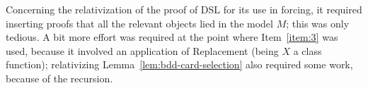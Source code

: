 Concerning the relativization of the proof of DSL for its use in
forcing, it required inserting proofs that all the relevant objects
lied in the model $M$; this was only tedious.
A bit more effort was required at the point where Item~\ref{item:3}
was used, because it involved an application of Replacement (being $X$
a class function); relativizing
Lemma~\ref{lem:bdd-card-selection} also required some work, because of the
recursion.


